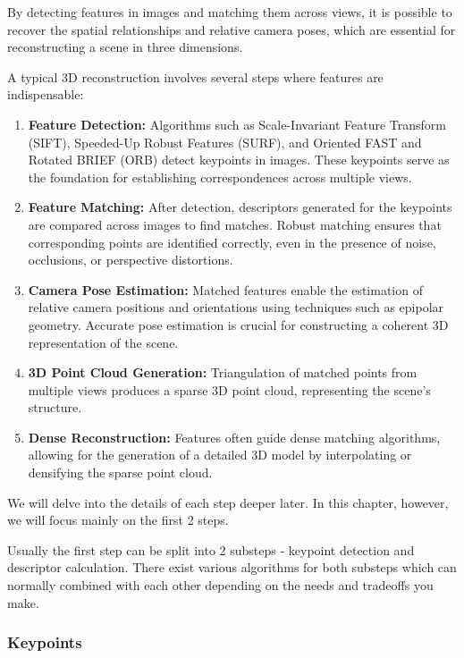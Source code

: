 \documentclass[11pt]{book}
\begin{document}
By detecting features in images and matching them across views, it is possible to recover the spatial relationships and relative camera poses, which are essential for reconstructing a scene in three dimensions.

A typical 3D reconstruction involves several steps where features are indispensable:

\begin{enumerate}
 \item \textbf{Feature Detection:} Algorithms such as Scale-Invariant Feature Transform (SIFT), Speeded-Up Robust Features (SURF), and Oriented FAST and Rotated BRIEF (ORB) detect keypoints in images. These keypoints serve as the foundation for establishing correspondences across multiple views.
 \item \textbf{Feature Matching:} After detection, descriptors generated for the keypoints are compared across images to find matches. Robust matching ensures that corresponding points are identified correctly, even in the presence of noise, occlusions, or perspective distortions.
\item \textbf{Camera Pose Estimation:} Matched features enable the estimation of relative camera positions and orientations using techniques such as epipolar geometry. Accurate pose estimation is crucial for constructing a coherent 3D representation of the scene.
\item \textbf{3D Point Cloud Generation:} Triangulation of matched points from multiple views produces a sparse 3D point cloud, representing the scene's structure.
\item \textbf{Dense Reconstruction:} Features often guide dense matching algorithms, allowing for the generation of a detailed 3D model by interpolating or densifying the sparse point cloud.
 \end{enumerate}

 We will delve into the details of each step deeper later. In this chapter, however, we will focus mainly on the first 2 steps.
 
 Usually the first step can be split into 2 substeps - keypoint detection and descriptor calculation. There exist various algorithms for both substeps which can normally combined with each other depending on the needs and tradeoffs you make. 
 
 \subsubsection{Keypoints}
 
\end{document}
